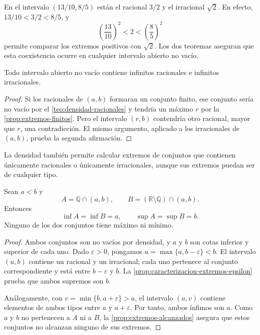 \begin{example}
En el intervalo $(13/10,8/5)$ están el racional $3/2$ y el irracional $\sqrt2$. En efecto, $13/10<3/2<8/5$, y
\[
 \left(\frac{13}{10}\right)^2<2<
 \left(\frac85\right)^2
\]
permite comparar los extremos positivos con $\sqrt2$. Los dos teoremas aseguran que esta coexistencia ocurre en cualquier intervalo abierto no vacío.
\end{example}

\begin{samepage}
\begin{corollary}
\label{cor:infinitos-en-intervalo}
Todo intervalo abierto no vacío contiene infinitos racionales e infinitos irracionales.
\end{corollary}
\end{samepage}

\begin{proof}
Si los racionales de $(a,b)$ formaran un conjunto finito, ese conjunto sería no vacío por el \cref{teo:densidad-racionales} y tendría un máximo $r$ por la \cref{prop:extremos-finitos}. Pero el intervalo $(r,b)$ contendría otro racional, mayor que $r$, una contradicción. El mismo argumento, aplicado a los irracionales de $(a,b)$, prueba la segunda afirmación.
\end{proof}

La densidad también permite calcular extremos de conjuntos que contienen únicamente racionales o únicamente irracionales, aunque sus extremos puedan ser de cualquier tipo.

\begin{samepage}
\begin{corollary}
\label{cor:extremos-densos}
Sean $a<b$ y
\[
 A=\mathbb{Q}\cap(a,b),
 \qquad
 B=(\mathbb{R}\setminus\mathbb{Q})\cap(a,b).
\]
Entonces
\[
 \inf A=\inf B=a,
 \qquad
 \sup A=\sup B=b.
\]
Ninguno de los dos conjuntos tiene máximo ni mínimo.
\end{corollary}
\end{samepage}

\begin{proof}
Ambos conjuntos son no vacíos por densidad, y $a$ y $b$ son cotas inferior y superior de cada uno. Dado $\varepsilon>0$, pongamos $u=\max\{a,b-\varepsilon\}<b$. El intervalo $(u,b)$ contiene un racional y un irracional; cada uno pertenece al conjunto correspondiente y está entre $b-\varepsilon$ y $b$. La \cref{prop:caracterizacion-extremos-epsilon} prueba que ambos supremos son $b$.

Análogamente, con $v=\min\{b,a+\varepsilon\}>a$, el intervalo $(a,v)$ contiene elementos de ambos tipos entre $a$ y $a+\varepsilon$. Por tanto, ambos ínfimos son $a$. Como $a$ y $b$ no pertenecen a $A$ ni a $B$, la \cref{prop:extremos-alcanzados} asegura que estos conjuntos no alcanzan ninguno de sus extremos.
\end{proof}

